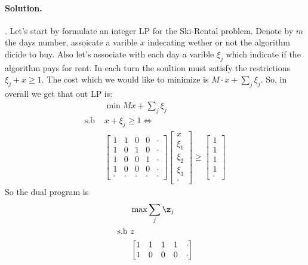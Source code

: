\documentclass{article}
\begin{document}
\begin{multicols*}{2}
  \paragraph{Solution.}. Let's start by formulate an integer LP for the Ski-Rental problem. Denote by $m$ the days number, assoicate a varible $x$ indecating wether or not the algorithm dicide to buy. Also let's associate with each day a varible $\xi_{j}$ which indicate if the algorithm pays for rent. In each turn the soultion must satisfy the restrictions $ \xi_{j} + x  \ge 1$. The cost which we would like to minimize is $ M\cdot x + \sum_{j}{\xi_{j}}$. So, in overall we get that out LP is:    
  \begin{equation*}
    \begin{split}
      & \min{ Mx + \sum_{j}{\xi_{j}}} \\
      \text{s.b } & x + \xi_{j} \ge 1 \Leftrightarrow \\ 
      & \begin{bmatrix}
	1 & 1 & 0 & 0 & \cdot\\
	1 & 0 & 1 & 0 & \cdot\\
	1 & 0 & 0 & 1 & \cdot\\
	1 & 0 & 0 & 0 & \cdot\\
	\cdot & \cdot & \cdot & \cdot & \cdot
      \end{bmatrix} 
      \begin{bmatrix}
	x \\
	\xi_{1} \\ 
	\xi_{2} \\
	\xi_{3} \\
	\cdot 
      \end{bmatrix} \ge
      \begin{bmatrix}
	1 \\
	1 \\ 
	1 \\
	1 \\
	\cdot 
      \end{bmatrix}
    \end{split}
  \end{equation*}
  So the dual program is 
  \begin{equation*}
    \begin{split}
      & \max{ \sum_{j}{\z_{j}}} \\
      \text{s.b } &  z  \\ 
      & \begin{bmatrix}
	1 & 1 & 1 & 1 & \cdot \\
	1 & 0 & 0 & 0 & \cdot \\

\end{bmatrix}
\end{split}
\end{equation*}
\end{multicols*}
\end{document}
